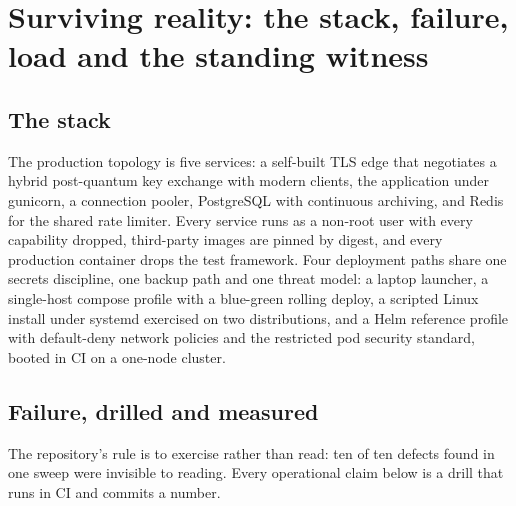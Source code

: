 \section{Surviving reality: the stack, failure, load and the standing witness}
\label{sec:operations}

\subsection{The stack}

The production topology is five services: a self-built TLS edge that negotiates a hybrid
post-quantum key exchange with modern clients, the application under gunicorn, a connection pooler,
PostgreSQL with continuous archiving, and Redis for the shared rate limiter. Every service runs as a
non-root user with every capability dropped, third-party images are pinned by digest, and every
production container drops the test framework. Four deployment paths share one secrets discipline,
one backup path and one threat model: a laptop launcher, a single-host compose profile with a
blue-green rolling deploy, a scripted Linux install under systemd exercised on two distributions,
and a Helm reference profile with default-deny network policies and the restricted pod security
standard, booted in CI on a one-node cluster. \sImpl

\subsection{Failure, drilled and measured}

The repository's rule is to exercise rather than read: ten of ten defects found in one sweep were
invisible to reading. Every operational claim below is a drill that runs in CI and commits a number.

